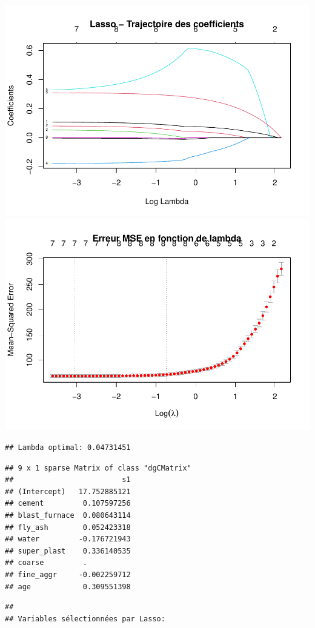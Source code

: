 \documentclass[
  12pt,
]{article}
\begin{document}
\includegraphics{rmd_final_files/figure-latex/unnamed-chunk-54-1.pdf}
\includegraphics{rmd_final_files/figure-latex/unnamed-chunk-54-2.pdf}

\begin{verbatim}
## Lambda optimal: 0.04731451
\end{verbatim}

\begin{verbatim}
## 9 x 1 sparse Matrix of class "dgCMatrix"
##                         s1
## (Intercept)   17.752885121
## cement         0.107597256
## blast_furnace  0.080643114
## fly_ash        0.052423318
## water         -0.176721943
## super_plast    0.336140535
## coarse         .          
## fine_aggr     -0.002259712
## age            0.309551398
\end{verbatim}

\begin{verbatim}
## 
## Variables sélectionnées par Lasso:
\end{verbatim}
\end{document}

